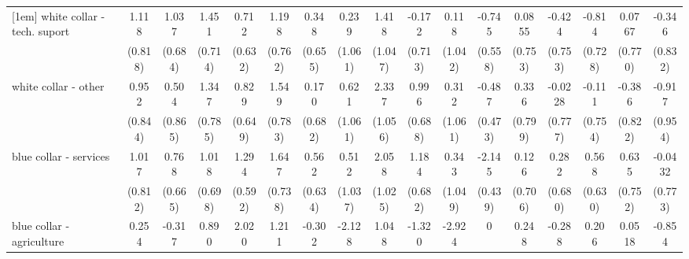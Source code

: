 {\begin{tabular}{l*{16}{c}}
[1em]
white collar - tech. suport&       1.118         &       1.037         &       1.451\sym{*}  &       0.712         &       1.198         &       0.348         &       0.239         &       1.418         &      -0.172         &       0.118         &      -0.745         &      0.0855         &      -0.424         &      -0.814         &      0.0767         &      -0.346         \\
                    &     (0.818)         &     (0.684)         &     (0.714)         &     (0.632)         &     (0.762)         &     (0.655)         &     (1.061)         &     (1.047)         &     (0.713)         &     (1.042)         &     (0.558)         &     (0.753)         &     (0.753)         &     (0.728)         &     (0.770)         &     (0.832)         \\
[1em]
white collar - other&       0.952         &       0.504         &       1.347         &       0.829         &       1.549\sym{*}  &       0.170         &       0.621         &       2.337\sym{*}  &       0.996         &       0.312         &      -0.487         &       0.336         &     -0.0228         &      -0.111         &      -0.386         &      -0.917         \\
                    &     (0.844)         &     (0.865)         &     (0.785)         &     (0.649)         &     (0.783)         &     (0.682)         &     (1.061)         &     (1.056)         &     (0.688)         &     (1.061)         &     (0.473)         &     (0.799)         &     (0.777)         &     (0.754)         &     (0.822)         &     (0.954)         \\
[1em]
blue collar - services&       1.017         &       0.768         &       1.018         &       1.294\sym{*}  &       1.647\sym{*}  &       0.562         &       0.512         &       2.058\sym{*}  &       1.184         &       0.343         &      -2.145\sym{***}&       0.126         &       0.282         &       0.568         &       0.635         &     -0.0432         \\
                    &     (0.812)         &     (0.665)         &     (0.698)         &     (0.592)         &     (0.738)         &     (0.634)         &     (1.037)         &     (1.025)         &     (0.682)         &     (1.049)         &     (0.439)         &     (0.706)         &     (0.680)         &     (0.630)         &     (0.752)         &     (0.773)         \\
[1em]
blue collar - agriculture&       0.254         &      -0.317         &       0.890         &       2.020\sym{**} &       1.211         &      -0.302         &      -2.128         &       1.048         &      -1.320         &      -2.924\sym{*}  &           0         &       0.248         &      -0.288         &       0.206         &      0.0518         &      -0.854         \\

\end{tabular}}
